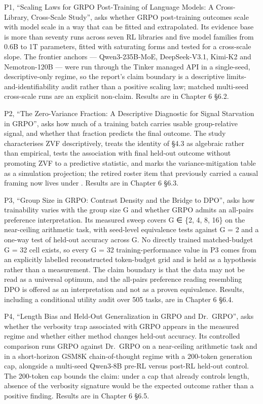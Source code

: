 \documentclass[12pt,a4paper]{report}
\DeclareRobustCommand{\longtok}[1]{\texttt{\seqsplit{#1}}}
\begin{document}
P1, ``Scaling Laws for GRPO Post-Training of Language Models: A
Cross-Library, Cross-Scale Study'', asks whether GRPO post-training
outcomes scale with model scale in a way that can be fitted and
extrapolated. Its evidence base is more than seventy runs across seven
RL libraries and five model families from 0.6B to 1T parameters, fitted
with saturating forms and tested for a cross-scale slope. The frontier
anchors --- Qwen3-235B-MoE, DeepSeek-V3.1, Kimi-K2 and Nemotron-120B ---
were run through the Tinker managed API in a single-seed,
descriptive-only regime, so the report's claim boundary is a descriptive
limits-and-identifiability audit rather than a positive scaling law;
matched multi-seed cross-scale runs are an explicit non-claim. Results
are in Chapter 6 §6.2.

P2, ``The Zero-Variance Fraction: A Descriptive Diagnostic for Signal
Starvation in GRPO'', asks how much of a training batch carries usable
group-relative signal, and whether that fraction predicts the final
outcome. The study characterises ZVF descriptively, treats the identity
of §4.3 as algebraic rather than empirical, tests the association with
final held-out outcome without promoting ZVF to a predictive statistic,
and marks the variance-mitigation table as a simulation projection; the
retired roster item that previously carried a causal framing now lives
under \longtok{archive/absorbed/R02\_\allowbreak{}main\_\allowbreak{}zvf/}. Results are in Chapter
6 §6.3.

P3, ``Group Size in GRPO: Contrast Density and the Bridge to DPO'', asks
how trainability varies with the group size G and whether GRPO admits an
all-pairs preference interpretation. Its measured sweep covers G ∈ \{2,
4, 8, 16\} on the near-ceiling arithmetic task, with seed-level
equivalence tests against G = 2 and a one-way test of held-out accuracy
across G. No directly trained matched-budget G = 32 cell exists, so
every G = 32 training-performance value in P3 comes from an explicitly
labelled reconstructed token-budget grid and is held as a hypothesis
rather than a measurement. The claim boundary is that the data may not
be read as a universal optimum, and the all-pairs preference reading
resembling DPO is offered as an interpretation and not as a proven
equivalence. Results, including a conditional utility audit over 505
tasks, are in Chapter 6 §6.4.

P4, ``Length Bias and Held-Out Generalization in GRPO and Dr.~GRPO'',
asks whether the verbosity trap associated with GRPO appears in the
measured regime and whether either method changes held-out accuracy. Its
controlled comparison runs GRPO against Dr.~GRPO on a near-ceiling
arithmetic task and in a short-horizon GSM8K chain-of-thought regime
with a 200-token generation cap, alongside a multi-seed Qwen3-8B pre-RL
versus post-RL held-out control. The 200-token cap bounds the claim:
under a cap that already controls length, absence of the verbosity
signature would be the expected outcome rather than a positive finding.
Results are in Chapter 6 §6.5.
\end{document}
